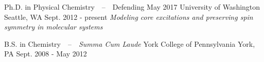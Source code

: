 


\begin{cventries}


\cventry
{Ph.D. in Physical Chemistry~~--~~Defending May 2017} %
{University of Washington} %
{Seattle, WA} %
{Sept. 2012 - present} %
{\textit{Modeling core excitations and preserving spin symmetry in molecular systems}}



\cventry
{B.S. in Chemistry~~--~~\textit{Summa Cum Laude}} %
{York College of Pennsylvania} %
{York, PA} %
{Sept. 2008 - May 2012} %
{}


\end{cventries}
